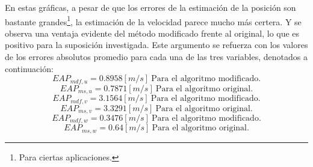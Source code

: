 \documentclass[10pt]{report}
\numberwithin{equation}{chapter}
\numberwithin{algorithm}{chapter}
\begin{document}
En estas gráficas, a pesar de que los errores de la estimación de la posición son bastante grandes\footnote{Para ciertas aplicaciones.}, la estimación de la velocidad parece mucho más certera. Y se observa una ventaja evidente del método modificado frente al original, lo que es positivo para la suposición investigada. Este argumento se refuerza con los valores de los errores absolutos promedio para cada una de las tres variables, denotados a continuación:
\begin{equation*}
EAP_{mdf,u}=0.8958 [m/s]~\text{Para el algoritmo modificado.}
\end{equation*}
\begin{equation*}
EAP_{ms,u}=0.7871 [m/s]~\text{Para el algoritmo original.}
\end{equation*}
\begin{equation*}
EAP_{mdf,v}=3.1564 [m/s]~\text{Para el algoritmo modificado.}
\end{equation*}
\begin{equation*}
EAP_{ms,v}=3.3291 [m/s]~\text{Para el algoritmo original.}
\end{equation*}
\begin{equation*}
EAP_{mdf,w}=0.3476 [m/s]~\text{Para el algoritmo modificado.}
\end{equation*}
\begin{equation*}
EAP_{ms,w}=0.64 [m/s]~\text{Para el algoritmo original.}
\end{equation*}
\end{document}
